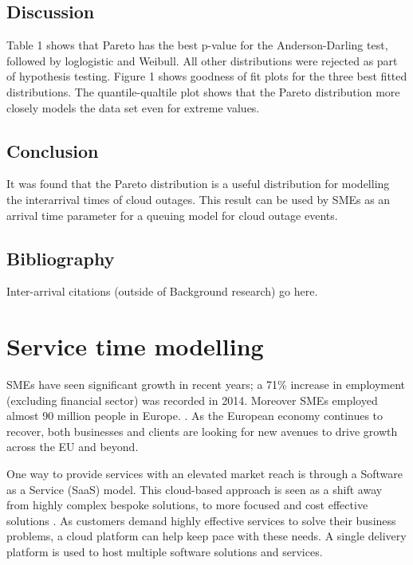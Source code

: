 \subsection{Discussion}
Table 1 shows that Pareto has the best p-value for the Anderson-Darling test, followed by loglogistic and Weibull. All other distributions were rejected as part of hypothesis testing. Figure 1 shows goodness of fit plots for the three best fitted distributions. The quantile-qualtile plot shows that the Pareto distribution more closely models the data set even for extreme values.


\subsection{Conclusion}

It was found that the Pareto distribution is a useful distribution for modelling the interarrival times of cloud outages. This result can be used by SMEs as an arrival time parameter for a queuing model for cloud outage events. 

\subsection{Bibliography}
Inter-arrival citations (outside of Background research) go here. 

\section{Service time modelling}

SMEs have seen significant growth in recent years; a 71\% increase in employment (excluding financial sector) was recorded in 2014. Moreover SMEs employed almost 90 million people in Europe. \cite{europa2015sme}. As the European economy continues to recover, both businesses and clients are looking for new avenues to drive growth across the EU and beyond. \par

One way to provide services with an elevated market reach is through a Software as a Service (SaaS) model. This cloud-based approach is seen as a shift away from highly complex bespoke solutions, to more focused and cost effective solutions \cite{cloudbook2015}. As customers demand highly effective services to solve their business problems, a cloud platform can help keep pace with these needs. A single delivery platform is used to host multiple software solutions and services. \par

